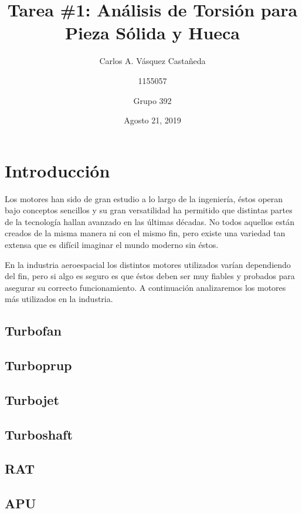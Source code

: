 \documentclass[12pt, letterpaper]{article}
\title{Tarea \#1: Análisis de Torsión para Pieza Sólida y Hueca}
\author{Carlos A. Vásquez Castañeda \and 1155057 \and Grupo 392}
\date{Agosto 21, 2019}
\begin{document}
\maketitle
\section*{Introducción}
Los motores han sido de gran estudio a lo largo de la ingeniería, éstos operan bajo conceptos sencillos y su gran versatilidad ha permitido que distintas partes de la tecnología hallan avanzado en las últimas décadas. No todos aquellos están creados de la misma manera ni con el mismo fin, pero existe una variedad tan extensa que es difícil imaginar el mundo moderno sin éstos.

En la industria aeroespacial los distintos motores utilizados varían dependiendo del fin, pero si algo es seguro es que éstos deben ser muy fiables y probados para asegurar su correcto funcionamiento. A continuación analizaremos los motores más utilizados en la industria.

\subsection*{Turbofan}

\subsection*{Turboprup}

\subsection*{Turbojet}

\subsection*{Turboshaft}

\subsection*{RAT}

\subsection*{APU}
\renewcommand\refname{Referencias}
\printbibliography
\end{document}
